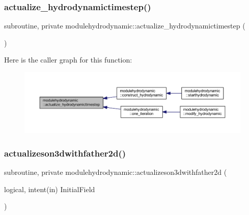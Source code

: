 \subsubsection{\texorpdfstring{actualize\+\_\+hydrodynamictimestep()}{actualize\_hydrodynamictimestep()}}
{\footnotesize\ttfamily subroutine, private modulehydrodynamic\+::actualize\+\_\+hydrodynamictimestep (\begin{DoxyParamCaption}{ }\end{DoxyParamCaption})\hspace{0.3cm}{\ttfamily [private]}}

Here is the caller graph for this function\+:\nopagebreak
\begin{figure}[H]
\begin{center}
\leavevmode
\includegraphics[width=350pt]{namespacemodulehydrodynamic_a1df79abd6d7bd327711cac635586b443_icgraph}
\end{center}
\end{figure}
\mbox{\label{namespacemodulehydrodynamic_a22559e3146696632ddf4733faac3f167}} 
\subsubsection{\texorpdfstring{actualizeson3dwithfather2d()}{actualizeson3dwithfather2d()}}
{\footnotesize\ttfamily subroutine, private modulehydrodynamic\+::actualizeson3dwithfather2d (\begin{DoxyParamCaption}\item[{logical, intent(in)}]{Initial\+Field }\end{DoxyParamCaption})\hspace{0.3cm}{\ttfamily [private]}}

